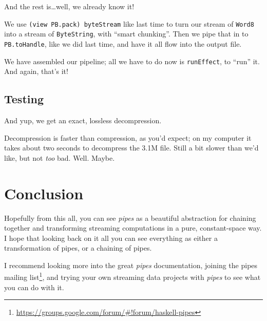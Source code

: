 \documentclass[]{article}
\newenvironment{Shaded}{}{}
\newcommand{\KeywordTok}[1]{\textcolor[rgb]{0.00,0.44,0.13}{\textbf{{#1}}}}
\newcommand{\CommentTok}[1]{\textcolor[rgb]{0.38,0.63,0.69}{\textit{{#1}}}}
\newcommand{\NormalTok}[1]{{#1}}
\renewcommand{\href}[2]{#2\footnote{\url{#1}}}
\begin{document}
And the rest is\ldots{}well, we already know it!

We use \texttt{(view\ PB.pack)\ byteStream} like last time to turn our
stream of \texttt{Word8} into a stream of \texttt{ByteString}, with
``smart chunking''. Then we pipe that in to \texttt{PB.toHandle}, like
we did last time, and have it all flow into the output file.

We have assembled our pipeline; all we have to do now is
\texttt{runEffect}, to ``run'' it. And again, that's it!

\subsection{Testing}\label{testing}

\begin{Shaded}
\end{Shaded}

And yup, we get an exact, lossless decompression.

Decompression is faster than compression, as you'd expect; on my
computer it takes about two seconds to decompress the 3.1M file. Still a
bit slower than we'd like, but not \emph{too} bad. Well. Maybe.

\section{Conclusion}\label{conclusion}

Hopefully from this all, you can see \emph{pipes} as a beautiful
abstraction for chaining together and transforming streaming
computations in a pure, constant-space way. I hope that looking back on
it all you can see everything as either a transformation of pipes, or a
chaining of pipes.

I recommend looking more into the great \emph{pipes} documentation,
joining the
\href{https://groups.google.com/forum/\#!forum/haskell-pipes}{pipes
mailing list}, and trying your own streaming data projects with
\emph{pipes} to see what you can do with it.
\end{document}
